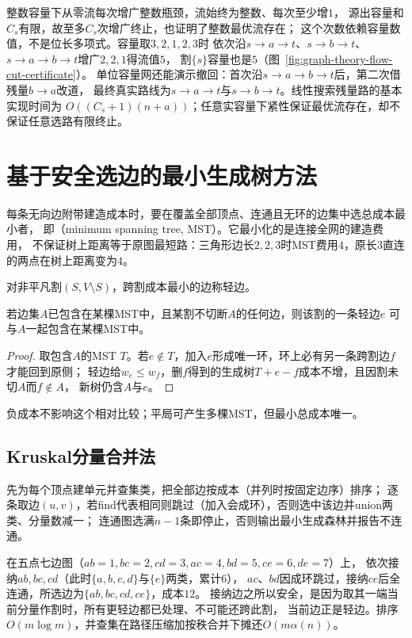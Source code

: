 整数容量下从零流每次增广整数瓶颈，流始终为整数、每次至少增$1$，
源出容量和$C_s$有限，故至多$C_s$次增广终止，也证明了整数最优流存在；
这个次数依赖容量数值，不是位长多项式。容量取$3,2,1,2,3$时
依次沿$s\to a\to t$、$s\to b\to t$、$s\to a\to b\to t$增广$2,2,1$得流值$5$，
割$\{s\}$容量也是$5$（图~\ref{fig:graph-theory-flow-cut-certificate}）。
单位容量网还能演示撤回：首次沿$s\to a\to b\to t$后，第二次借残量$b\to a$改道，
最终真实路线为$s\to a\to t$与$s\to b\to t$。线性搜索残量路的基本实现时间为
$O((C_s+1)(n+a))$；任意实容量下紧性保证最优流存在，却不保证任意选路有限终止。

\section{基于安全选边的最小生成树方法}
\label{sec:graph-theory-minimum-spanning-tree}

每条无向边附带建造成本时，要在覆盖全部顶点、连通且无环的边集中选总成本最小者，
即（minimum spanning tree, MST）。它最小化的是连接全网的建造费用，
不保证树上距离等于原图最短路：三角形边长$2,2,3$时MST费用$4$，原长$3$直连的两点在树上距离变为$4$。

对非平凡割$(S,V\setminus S)$，跨割成本最小的边称轻边。
\begin{lemma}[最小生成树的割性质]
  \label{lem:graph-theory-mst-cut-property}
  若边集$A$已包含在某棵MST中，且某割不切断$A$的任何边，则该割的一条轻边$e$
  可与$A$一起包含在某棵MST中。
\end{lemma}
\begin{proof}
取包含$A$的MST $T$。若$e\notin T$，加入$e$形成唯一环，环上必有另一条跨割边$f$才能回到原侧；
轻边给$w_e\leq w_f$，删$f$得到的生成树$T+e-f$成本不增，且因割未切$A$而$f\notin A$，
新树仍含$A$与$e$。
\end{proof}
负成本不影响这个相对比较；平局可产生多棵MST，但最小总成本唯一。

\subsection{Kruskal分量合并法}
\begin{algorithm}[Kruskal]
  先为每个顶点建单元并查集类，把全部边按成本（并列时按固定边序）排序；
  逐条取边$(u,v)$，若find代表相同则跳过（加入会成环），否则选中该边并union两类、分量数减一；
  连通图选满$n-1$条即停止，否则输出最小生成森林并报告不连通。
\end{algorithm}
在五点七边图（$ab=1,bc=2,cd=3,ac=4,bd=5,ce=6,de=7$）上，
依次接纳$ab,bc,cd$（此时$\{a,b,c,d\}$与$\{e\}$两类，累计$6$），
$ac$、$bd$因成环跳过，接纳$ce$后全连通，所选边为$\{ab,bc,cd,ce\}$，成本$12$。
接纳边之所以安全，是因为取其一端当前分量作割时，所有更轻边都已处理、不可能还跨此割，
当前边正是轻边。排序$O(m\log m)$，并查集在路径压缩加按秩合并下摊还$O(m\alpha(n))$。

